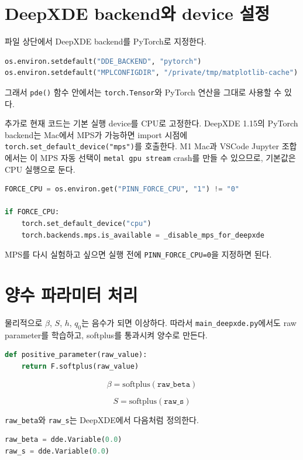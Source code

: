 \documentclass[11pt]{article}
\begin{document}
\section{DeepXDE backend와 device 설정}

파일 상단에서 DeepXDE backend를 PyTorch로 지정한다.

\begin{lstlisting}[language=Python]
os.environ.setdefault("DDE_BACKEND", "pytorch")
os.environ.setdefault("MPLCONFIGDIR", "/private/tmp/matplotlib-cache")
\end{lstlisting}

그래서 \texttt{pde()} 함수 안에서는 \texttt{torch.Tensor}와 PyTorch 연산을 그대로 사용할 수 있다.

추가로 현재 코드는 기본 실행 device를 CPU로 고정한다.
DeepXDE 1.15의 PyTorch backend는 Mac에서 MPS가 가능하면 import 시점에 \texttt{torch.set\_default\_device("mps")}를 호출한다.
M1 Mac과 VSCode Jupyter 조합에서는 이 MPS 자동 선택이 \texttt{metal gpu stream} crash를 만들 수 있으므로, 기본값은 CPU 실행으로 둔다.

\begin{lstlisting}[language=Python]
FORCE_CPU = os.environ.get("PINN_FORCE_CPU", "1") != "0"

if FORCE_CPU:
    torch.set_default_device("cpu")
    torch.backends.mps.is_available = _disable_mps_for_deepxde
\end{lstlisting}

MPS를 다시 실험하고 싶으면 실행 전에 \texttt{PINN\_FORCE\_CPU=0}을 지정하면 된다.

\section{양수 파라미터 처리}

물리적으로 \(\beta\), \(S\), \(h\), \(q_0\)는 음수가 되면 이상하다. 따라서 \texttt{main\_deepxde.py}에서도 raw parameter를 학습하고, softplus를 통과시켜 양수로 만든다.

\begin{lstlisting}[language=Python]
def positive_parameter(raw_value):
    return F.softplus(raw_value)
\end{lstlisting}

\[
\beta = \mathrm{softplus}(\texttt{raw\_beta})
\]

\[
S = \mathrm{softplus}(\texttt{raw\_s})
\]

\texttt{raw\_beta}와 \texttt{raw\_s}는 DeepXDE에서 다음처럼 정의한다.

\begin{lstlisting}[language=Python]
raw_beta = dde.Variable(0.0)
raw_s = dde.Variable(0.0)
\end{lstlisting}
\end{document}
